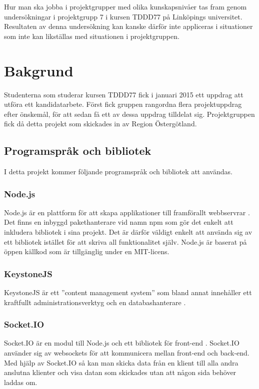 \documentclass{article}
\begin{document}
Hur man ska jobba i projektgrupper med olika kunskapsnivåer tas fram genom undersökningar i projektgrupp 7 i kursen TDDD77 på Linköpings universitet. Resultaten av denna undersökning kan kanske därför inte appliceras i situationer som inte kan likställas med situationen i projektgruppen.

\section{Bakgrund}
\label{bakgrund}
Studenterna som studerar kursen TDDD77 fick i januari 2015 ett uppdrag att utföra ett kandidatarbete. Först fick gruppen rangordna flera projektuppdrag efter önskemål, för att sedan få ett av dessa uppdrag tilldelat sig. Projektgruppen fick då detta projekt som skickades in av Region Östergötland.

\subsection{Programspråk och bibliotek}
I detta projekt kommer följande programspråk och bibliotek att användas.

\subsubsection{Node.js}
Node.js är en plattform för att skapa applikationer till framförallt webbservrar \cite{nodejs}. Det finns en inbyggd pakethanterare vid namn npm som gör det enkelt att inkludera bibliotek i sina projekt. Det är därför väldigt enkelt att använda sig av ett bibliotek istället för att skriva all funktionalitet själv. Node.js är baserat på öppen källkod som är tillgänglig under en MIT-licens.

\subsubsection{KeystoneJS}
KeystoneJS är ett ''content management system'' som bland annat innehåller ett kraftfullt administrationsverktyg och en databashanterare \cite{keystonejs}.

\subsubsection{Socket.IO}
Socket.IO är en modul till Node.js och ett bibliotek för front-end \cite{socketio}. Socket.IO använder sig av websockets för att kommunicera mellan front-end och back-end. Med hjälp av Socket.IO så kan man skicka data från en klient till alla andra anslutna klienter och visa datan som skickades utan att någon sida behöver laddas om.
\end{document}
